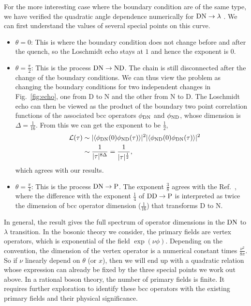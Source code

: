 For the more interesting case where the boundary condition are of the same type, we have verified the quadratic angle dependence numerically for ${\rm DN} \rightarrow \lambda$ {\iffalse \color{red}the process in Eq.~\eqref{eq:DNDN}.\fi}. We can first understand the values of several special points on this curve. 
\begin{itemize}
\item $\theta = 0$: This is where the boundary condition does not change before and after the quench, so the Loschmidt echo stays at $1$ and hence the exponent is $0$.
\item $\theta = \frac{\pi}{2}$: This is the process ${\rm DN}\rightarrow {\rm  ND}$. The chain is still disconnected after the change of the boundary conditions. We can thus view the problem as changing the boundary conditions for two independent changes in Fig.~\ref{fig:echo}, one from D to N and the other from N to D. The Loschmidt echo can then be viewed as the product of the boundary two point correlation functions of the associated bcc operators $\phi_{\rm DN}$ and $\phi_{\rm ND}$, whose dimension is $\Delta = \frac{1}{16}$. From this we can get the exponent to be $\frac{1}{2}$,
\begin{equation}
\begin{aligned}
  \quad \mathcal{L}(\tau) &\sim |\langle \phi_{{\rm D N}}(0) \phi_{{\rm ND}}(\tau)   \rangle |^2 
|\langle \phi_{{\rm ND}}(0)  \phi_{{\rm DN}}(\tau)   \rangle| ^2\\
& \sim \frac{1}{|\tau|^{8\Delta}} = \frac{1}{|\tau|^{\frac{1}{2}}},
\end{aligned}
\end{equation}
which agrees with our results. 
\item $\theta = \frac{\pi}{4}$: This is the process ${\rm DN}\rightarrow {\rm P}$. The exponent $\frac{3}{8}$ agrees with the Ref.~, where the difference with the exponent $\frac{1}{4}$ of ${\rm DD} \rightarrow {\rm P}$ is interpreted as twice the dimension of bcc operator dimension ($\frac{1}{16}$) that transforms D to N.
\end{itemize}
In general, the result gives the full spectrum of operator dimensions in the ${\rm DN}$ to $\lambda $ transition. In the bosonic theory we consider, the primary fields are vertex operators, which is exponential of the field $\exp( \nu \phi )$. Depending on the convention, the dimension of the vertex operator is a numerical constant times $\frac{\nu^2}{8\pi}$. So if $\nu$ linearly depend on $\theta$ (or $x$), then we will end up with a quadratic relation whose expression can already be fixed by the three special points we work out above. In a rational boson theory, the number of primary fields is finite. It requires further exploration to identify these bcc operators with the existing primary fields and their physical significance. 

